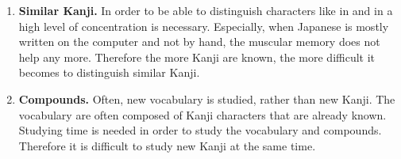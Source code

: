 \begin{enumerate}
  \item \textbf{Similar Kanji.} In order to be able to distinguish characters 
        like  in  and  in  a high level of
        concentration is necessary. Especially, when Japanese is mostly written
        on the computer and not by hand, the muscular memory 
        does not help any more. Therefore the more Kanji are known, the more 
        difficult it becomes to distinguish similar Kanji.

  \item \textbf{Compounds.} Often, new vocabulary is studied, rather than new 
        Kanji. The vocabulary are often composed of Kanji characters that are 
        already known. Studying time is needed in order to study the vocabulary 
        and compounds. Therefore it is difficult to study new Kanji at the same
        time.


\end{enumerate}

